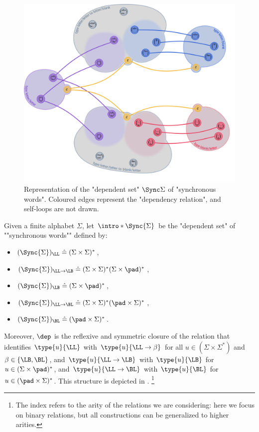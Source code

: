 \begin{figure}[htb]
	\begin{center}
		\includegraphics[width=\linewidth]{fig/algebra/free_algebras.png}
	\end{center}
	\caption{
		\AP\label{fig:free_algebras}
		Representation of the "dependent set" $\Sync\Sigma$ of "synchronous words".
		Coloured edges represent the "dependency relation", and self-loops are not drawn. 
	} 
\end{figure}
\begin{example}
	Given a finite alphabet $\Sigma$, let $\intro*\Sync{\Sigma}$ be the "dependent set" of ""synchronous words"" defined by:
	\vspace{-1.25em}
	\begin{multicols}{2}
	\begin{itemize}
		\item $(\Sync{\Sigma})_{\LL} \defeq (\Sigma\times \Sigma)^*$,
		\item $(\Sync{\Sigma})_{\LL\to\LB} \defeq (\Sigma\times \Sigma)^*(\Sigma\times \pad)^*$,
		\item $(\Sync{\Sigma})_{\LB} \defeq (\Sigma\times \pad)^*$,
		\columnbreak
		\vfill
		\item $(\Sync{\Sigma})_{\LL\to\BL} \defeq (\Sigma\times \Sigma)^*(\pad\times \Sigma)^*$,
		\item $(\Sync{\Sigma})_{\BL} \defeq (\pad\times \Sigma)^*$.
	\end{itemize}
	\end{multicols}
	\vspace{-1em}
	Moreover, $\dep$ is the reflexive and symmetric closure of the relation that
	identifies $\type{u}{\LL}$ with $\type{u}{\LL\to\beta}$ for all
	$u \in (\Sigma\times\Sigma^*)$ and $\beta \in \{\LB,\BL\}$, 
	and $\type{u}{\LL\to\LB}$ with $\type{u}{\LB}$
	for $u \in (\Sigma\times\pad)^*$,
	and $\type{u}{\LL\to\BL}$ with $\type{u}{\BL}$
	for $u \in (\pad\times\Sigma)^*$.
	This structure is depicted in .%
	\footnote{The index refers to the arity of the relations we are considering: here we focus on binary relations, but all constructions can be generalized to higher arities.}
\end{example}

